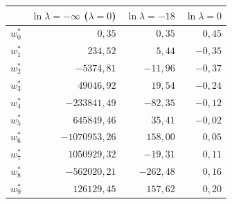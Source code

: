 \begin{tabular}{lrrr}
\toprule
 & $\ln\lambda=-\infty$ ($\lambda=0$) & $\ln\lambda=-18$ & $\ln\lambda=0$ \\
\midrule
$w_0^*$ & $0{,}35$ & $0{,}35$ & $0{,}45$ \\
$w_1^*$ & $234{,}52$ & $5{,}44$ & $-0{,}35$ \\
$w_2^*$ & $-5374{,}81$ & $-11{,}96$ & $-0{,}37$ \\
$w_3^*$ & $49046{,}92$ & $19{,}54$ & $-0{,}24$ \\
$w_4^*$ & $-233841{,}49$ & $-82{,}35$ & $-0{,}12$ \\
$w_5^*$ & $645849{,}46$ & $35{,}41$ & $-0{,}02$ \\
$w_6^*$ & $-1070953{,}26$ & $158{,}00$ & $0{,}05$ \\
$w_7^*$ & $1050929{,}32$ & $-19{,}31$ & $0{,}11$ \\
$w_8^*$ & $-562020{,}21$ & $-262{,}48$ & $0{,}16$ \\
$w_9^*$ & $126129{,}45$ & $157{,}62$ & $0{,}20$ \\
\bottomrule
\end{tabular}
